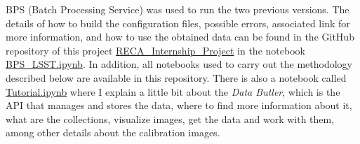 BPS (Batch Processing Service) was used to run the two previous versions. The details of how to build the configuration files, possible errors, associated link for more information, and how to use the obtained data can be found in the GitHub repository of this project \href{https://github.com/linagiraldom/RECA_Internship_Project}{RECA\_Internship\_Project} in the notebook \href{https://github.com/linagiraldom/RECA_Internship_Project/blob/main/Notebooks/BPS_LSST.ipynb}{BPS\_LSST.ipynb}. In addition, all notebooks used to carry out the methodology described below are available in this repository. There is also a notebook called \href{https://github.com/linagiraldom/RECA_Internship_Project/blob/main/Notebooks/Tutorial.ipynb}{Tutorial.ipynb} where I explain a little bit about the \textit{Data Butler}, which is the API that manages and stores the data, where to find more information about it, what are the collections, visualize images, get the data and work with them, among other details about the calibration images.



